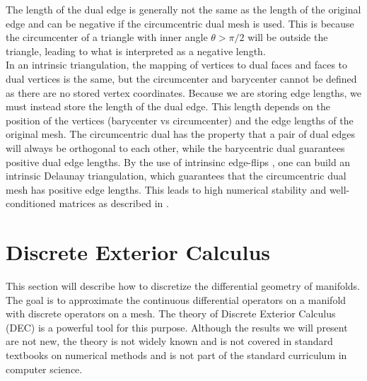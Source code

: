 The length of the dual edge is generally not the same as the length of the original edge and can be negative if the circumcentric dual mesh is used. This is because the circumcenter of a triangle with inner angle $\theta > \pi/2$ will be outside the triangle, leading to what is interpreted as a negative length.
\\
In an intrinsic triangulation, the mapping of vertices to dual faces and faces to dual vertices is the same, but the circumcenter and barycenter cannot be defined as there are no stored vertex coordinates. Because we are storing edge lengths, we must instead store the length of the dual edge. This length depends on the position of the vertices (barycenter vs circumcenter) and the edge lengths of the original mesh. The circumcentric dual has the property that a pair of dual edges will always be orthogonal to each other, while the barycentric dual guarantees positive dual edge lengths. By the use of intrinsinc edge-flips \cite{sharp2021intrinsic}, one can build an intrinsic Delaunay triangulation, which guarantees that the circumcentric dual mesh has positive edge lengths. This leads to high numerical stability and well-conditioned matrices as described in \cite{intrinsic_laplacian}. 

\section*{Discrete Exterior Calculus}
This section will describe how to discretize the differential geometry of manifolds. The goal is to approximate the continuous differential operators on a manifold with discrete operators on a mesh. The theory of Discrete Exterior Calculus (DEC) is a powerful tool for this purpose. Although the results we will present are not new, the theory is not widely known and is not covered in standard textbooks on numerical methods and is not part of the standard curriculum in computer science.

